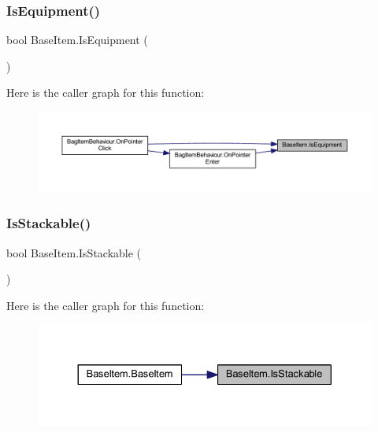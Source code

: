 \subsubsection{\texorpdfstring{IsEquipment()}{IsEquipment()}}
{\footnotesize\ttfamily bool Base\+Item.\+Is\+Equipment (\begin{DoxyParamCaption}{ }\end{DoxyParamCaption})}

Here is the caller graph for this function\+:
\nopagebreak
\begin{figure}[H]
\begin{center}
\leavevmode
\includegraphics[width=350pt]{class_base_item_a251c4cb0509ed9191a07057f8ea388c6_icgraph}
\end{center}
\end{figure}
\mbox{\label{class_base_item_ad59a505bcfb8a026519ca912d0c1d8d3}} 
\subsubsection{\texorpdfstring{IsStackable()}{IsStackable()}}
{\footnotesize\ttfamily bool Base\+Item.\+Is\+Stackable (\begin{DoxyParamCaption}{ }\end{DoxyParamCaption})}

Here is the caller graph for this function\+:
\nopagebreak
\begin{figure}[H]
\begin{center}
\leavevmode
\includegraphics[width=330pt]{class_base_item_ad59a505bcfb8a026519ca912d0c1d8d3_icgraph}
\end{center}
\end{figure}
\mbox{\label{class_base_item_abedb8e41aaa0f3ee702ae8fa678204e2}} 
